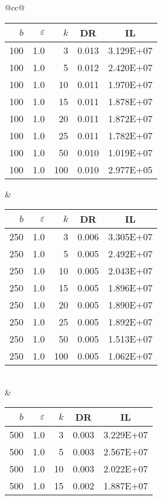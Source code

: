 \begin{table}[H]
	\centering
	\begin{tabular}{@{}cc@{}}
		\begin{tabular}{@{}rrrrr@{}}
			\toprule
			$b$ & $\varepsilon$ & $k$ & \multicolumn{1}{c}{DR} & \multicolumn{1}{c}{IL} \\ \midrule
			100 & 1.0 & 3   & 0.013 & 3.129E+07 \\
			100 & 1.0 & 5   & 0.012 & 2.420E+07 \\
			100 & 1.0 & 10  & 0.011 & 1.970E+07 \\
			100 & 1.0 & 15  & 0.011 & 1.878E+07 \\
			100 & 1.0 & 20  & 0.011 & 1.872E+07 \\
			100 & 1.0 & 25  & 0.011 & 1.782E+07 \\
			100 & 1.0 & 50  & 0.010 & 1.019E+07 \\
			100 & 1.0 & 100 & 0.010 & 2.977E+05 \\ \bottomrule
		\end{tabular}
		&
		\begin{tabular}{@{}rrrrr@{}}
			\toprule
			$b$ & $\varepsilon$ & $k$ & \multicolumn{1}{c}{DR} & \multicolumn{1}{c}{IL} \\ \midrule
			250 & 1.0 & 3   & 0.006 & 3.305E+07 \\
			250 & 1.0 & 5   & 0.005 & 2.492E+07 \\
			250 & 1.0 & 10  & 0.005 & 2.043E+07 \\
			250 & 1.0 & 15  & 0.005 & 1.896E+07 \\
			250 & 1.0 & 20  & 0.005 & 1.890E+07 \\
			250 & 1.0 & 25  & 0.005 & 1.892E+07 \\
			250 & 1.0 & 50  & 0.005 & 1.513E+07 \\
			250 & 1.0 & 100 & 0.005 & 1.062E+07 \\ \bottomrule
		\end{tabular}
		\\ & \\
		\begin{tabular}{@{}rrrrr@{}}
			\toprule
			$b$ & $\varepsilon$ & $k$ & \multicolumn{1}{c}{DR} & \multicolumn{1}{c}{IL} \\ \midrule
			500 & 1.0 & 3   & 0.003 & 3.229E+07 \\
			500 & 1.0 & 5   & 0.003 & 2.567E+07 \\
			500 & 1.0 & 10  & 0.003 & 2.022E+07 \\
			500 & 1.0 & 15  & 0.002 & 1.887E+07 \\

\end{tabular}
\end{tabular}
\end{table}
